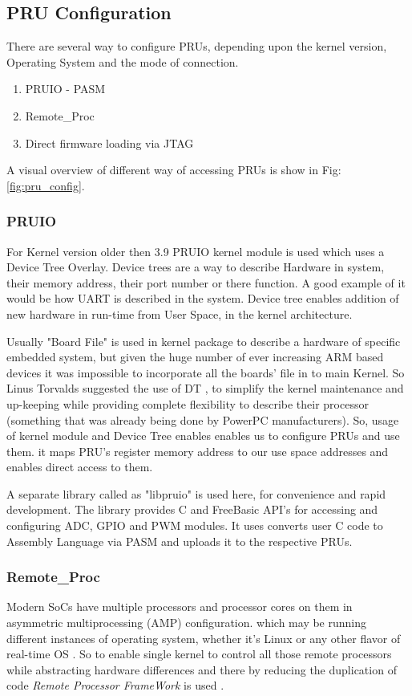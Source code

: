 \subsection{PRU Configuration}
There are several way to configure PRUs, depending upon the kernel version, Operating System and the mode of connection.
\begin{enumerate}
	\item PRUIO - PASM 
	\item Remote\_Proc
	\item Direct firmware loading via JTAG
\end{enumerate}

A visual overview of different way of accessing PRUs is show in Fig: \ref{fig:pru_config}.
\subsubsection{PRUIO}
 For Kernel version older then 3.9 PRUIO kernel module is used which uses a Device Tree Overlay. Device trees are a way to describe Hardware in system, their memory address, their port number or there function. A good example of it would be how UART is described in the system. Device tree enables addition of new hardware in run-time from User Space, in the kernel architecture. 
 
 Usually "Board File" is used in kernel package to describe a hardware of specific embedded system, but given the huge number of ever increasing ARM based devices it was impossible to incorporate all the boards' file in to main Kernel. So Linus Torvalds \cite{DThist} suggested the use of DT , to simplify the kernel maintenance and up-keeping while providing complete flexibility to describe their processor (something that was already being done by PowerPC manufacturers). So, usage of kernel module and Device Tree enables enables us to configure PRUs and use them. it maps PRU's register memory address to our use space addresses and enables direct access to them. 
 
 A separate library  called as "libpruio" \cite{libpruio} is used here, for convenience and rapid development. The library provides C and FreeBasic API's for accessing and configuring ADC, GPIO and PWM modules. It uses converts user C code to Assembly Language via PASM and uploads it to the respective PRUs.
 
 \subsubsection{Remote\_Proc}
 Modern SoCs have multiple processors and processor cores on them in asymmetric multiprocessing (AMP) configuration. which may be running different instances  of operating system, whether it's Linux or any other flavor of real-time OS  . So to enable single kernel to control all those remote processors while abstracting hardware differences and there by reducing the duplication of code \textit{Remote Processor FrameWork} is used \cite{remoteproc}.


